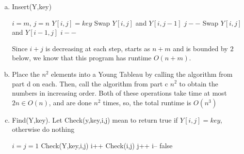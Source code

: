 \documentclass{article}
\begin{document}
\begin{enumerate}[a.]
\item
Insert(Y,key)
\begin{algorithm}
\begin{algorithmic}[1]
\State$i=m$, $j=n$
\State $Y[i,j] = key$
\State Swap $Y[i,j]$ and $Y[i,j-1]$
\State $j--$
\Else
\State Swap $Y[i,j]$ and $Y[i-1,j]$
\State $i--$
\EndIf
\EndWhile
\end{algorithmic}
\end{algorithm}
Since $i+j$ is decreasing at each step, starts as $n+m$ and is bounded by $2$ below, we know that this program has runtime $O(n+m)$.
\item
Place the $n^2$ elements into a Young Tableau by calling the algorithm from part d on each. Then, call the algorithm from part c $n^2$ to obtain the numbers in increasing order. Both of these operations take time at most $2n\in O(n)$, and are done $n^2$ times, so, the total runtime is $O(n^3)$
\item
Find(Y,key). Let Check(y,key,i,j) mean to return true if $Y[i,j]=key$, otherwise do nothing
\begin{algorithm}
\begin{algorithmic}
\State$ i =j= 1$
\State Check(Y,key,i,j)
\State i++
\EndWhile
{}
\State Check(i,j)
\State j++
\Else
\State i--
\EndIf
\EndWhile
\State \Return false
\end{algorithmic}
\end{algorithm}
\end{enumerate}
\end{document}
